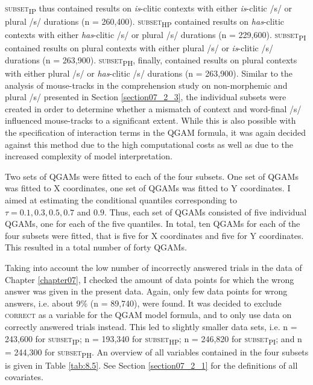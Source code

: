 \textsc{subset\textsubscript{IP}} thus contained results on \textit{is}-clitic contexts with either \textit{is}-clitic /s/ or plural /s/ durations (n = 260,400). \textsc{subset\textsubscript{HP}} contained results on \textit{has}-clitic contexts with either \textit{has}-clitic /s/ or plural /s/ durations (n = 229,600). \textsc{subset\textsubscript{PI}} contained results on plural contexts with either plural /s/ or \textit{is}-clitic /s/ durations (n = 263,900). \textsc{subset\textsubscript{PH}}, finally, contained results on plural contexts with either plural /s/ or \textit{has}-clitic /s/ durations (n = 263,900). Similar to the analysis of mouse-tracks in the comprehension study on non-morphemic and plural /s/ presented in Section \ref{section07_2_3}, the individual subsets were created in order to determine whether a mismatch of context and word-final /s/ influenced mouse-tracks to a significant extent. While this is also possible with the specification of interaction terms in the QGAM formula, it was again decided against this method due to the high computational costs as well as due to the increased complexity of model interpretation. 

Two sets of QGAMs were fitted to each of the four subsets. One set of QGAMs was fitted to X coordinates, one set of QGAMs was fitted to Y coordinates. I aimed at estimating the conditional quantiles corresponding to $\tau=0.1,0.3,0.5,0.7$ and $0.9$. Thus, each set of QGAMs consisted of five individual QGAMs, one for each of the five quantiles. In total, ten QGAMs for each of the four subsets were fitted, that is five for X coordinates and five for Y coordinates. This resulted in a total number of forty QGAMs.

Taking into account the low number of incorrectly answered trials in the data of Chapter \ref{chapter07}, I checked the amount of data points for which the wrong answer was given in the present data. Again, only few data points for wrong answers, i.e. about 9\% (n = 89,740), were found. It was decided to exclude \textsc{correct} as a variable for the QGAM model formula, and to only use data on correctly answered trials instead. This led to slightly smaller data sets, i.e. n = 243,600 for \textsc{subset\textsubscript{IP}}; n = 193,340 for \textsc{subset\textsubscript{HP}}; n = 246,820 for \textsc{subset\textsubscript{PI}}; and n = 244,300 for \textsc{subset\textsubscript{PH}}. An overview of all variables contained in the four subsets is given in Table \ref{tab:8.5}. See Section \ref{section07_2_1} for the definitions of all covariates.

